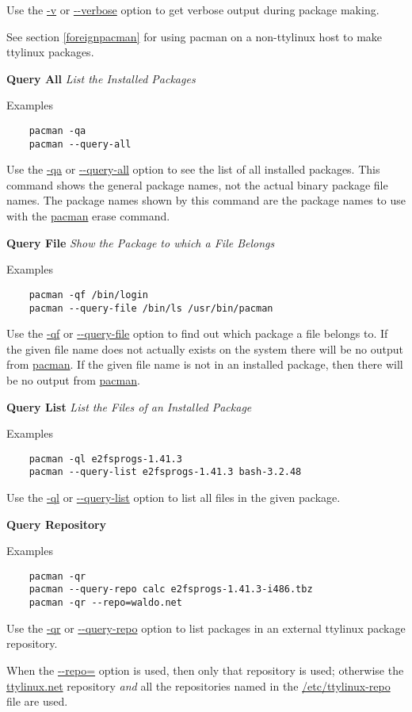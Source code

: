 \documentclass[10pt]{article}
\begin{document}
Use the \url{-v} or \url{--verbose} option to get verbose output during package
making.

See section \ref{foreignpacman} for using pacman on a non-ttylinux host to make
ttylinux packages.

{\bf Query All} {\it List the Installed Packages}

Examples
\begin{lstlisting}
	pacman -qa
	pacman --query-all
\end{lstlisting}

Use the \url{-qa} or \url{--query-all} option to see the list of all installed
packages. This command shows the general package names, not the actual binary
package file names. The package names shown by this command are the package
names to use with the \url{pacman} erase command.

{\bf Query File} {\it Show the Package to which a File Belongs}

Examples
\begin{lstlisting}
	pacman -qf /bin/login
	pacman --query-file /bin/ls /usr/bin/pacman
\end{lstlisting}

Use the \url{-qf} or \url{--query-file} option to find out which package a
file belongs to. If the given file name does not actually exists on the system
there will be no output from \url{pacman}. If the given file name is not in
an installed package, then there will be no output from \url{pacman}.

{\bf Query List} {\it List the Files of an Installed Package}

Examples
\begin{lstlisting}
	pacman -ql e2fsprogs-1.41.3
	pacman --query-list e2fsprogs-1.41.3 bash-3.2.48
\end{lstlisting}

Use the \url{-ql} or \url{--query-list} option to list all files in the given
package.

{\bf Query Repository}

Examples
\begin{lstlisting}
	pacman -qr
	pacman --query-repo calc e2fsprogs-1.41.3-i486.tbz
	pacman -qr --repo=waldo.net
\end{lstlisting}

Use the \url{-qr} or \url{--query-repo} option to list packages in an external
ttylinux package repository.

When the \url{--repo=} option is used, then only that repository is used;
otherwise the \url{ttylinux.net} repository {\it and} all the repositories
named in the \url{/etc/ttylinux-repo} file are used.
\end{document}
